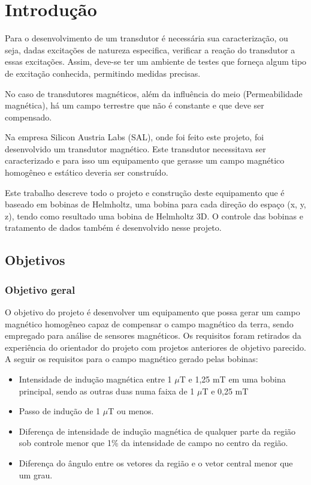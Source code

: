 \chapter{Introdução}

Para o desenvolvimento de um transdutor é necessária sua caracterização, ou seja, dadas excitações de natureza especifica, verificar a reação do transdutor a essas excitações. Assim, deve-se ter um ambiente de testes que forneça algum tipo de excitação conhecida, permitindo medidas precisas.

No caso de transdutores magnéticos, além da influência do meio (Permeabilidade magnética), há um campo terrestre que não é constante e que deve ser compensado.

Na empresa Silicon Austria Labs (SAL), onde foi feito este projeto, foi desenvolvido um transdutor magnético. Este transdutor necessitava ser caracterizado e para isso um equipamento que gerasse um campo magnético homogêneo e estático deveria ser construído.

Este trabalho descreve todo o projeto e construção deste equipamento que é baseado em bobinas de Helmholtz, uma bobina para cada direção do espaço (x, y, z), tendo como resultado uma bobina de Helmholtz 3D. O controle das bobinas e tratamento de dados também é desenvolvido nesse projeto.

\section{Objetivos}

\subsection{Objetivo geral}

O objetivo do projeto é desenvolver um equipamento que possa gerar um campo magnético homogêneo capaz de compensar o campo magnético da terra, sendo empregado para análise de sensores magnéticos. 
Os requisitos foram retirados da experiência do orientador do projeto com projetos anteriores de objetivo parecido. A seguir os requisitos para o campo magnético gerado pelas bobinas:    

\begin{itemize}
    \item Intensidade de indução magnética entre 1 $\mu$T e 1,25 mT em uma bobina principal, sendo as outras duas numa faixa de 1 $\mu$T e 0,25 mT
    \item Passo de indução de 1 $\mu$T ou menos.
    \item Diferença de intensidade de indução magnética de qualquer parte da região sob controle menor que 1\% da intensidade de campo no centro da região.
    \item Diferença do ângulo entre os vetores da região e o vetor central menor que um grau.
\end{itemize}

